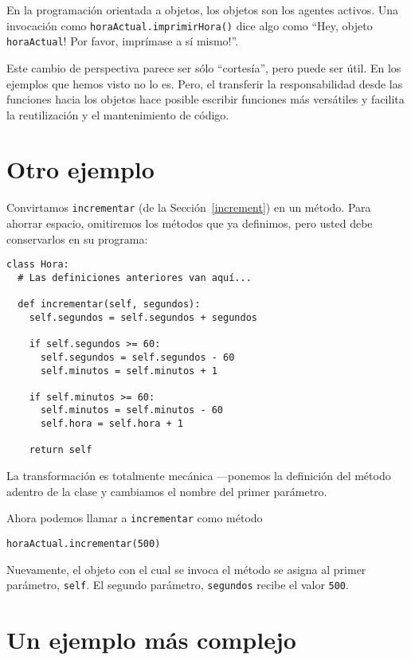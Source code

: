 En la programación orientada a objetos, los objetos son 
los agentes activos. Una invocación como \texttt{horaActual.imprimirHora()} 
dice algo como  ``Hey, objeto \texttt{horaActual}!  Por favor, imprímase a 
sí mismo!''.

Este cambio de perspectiva parece ser sólo ``cortesía'', pero puede
ser útil. En los ejemplos que hemos visto no lo es. Pero, el 
transferir la responsabilidad desde las funciones hacia los
objetos hace posible escribir funciones más versátiles y 
facilita la reutilización y el mantenimiento de código.


\section{Otro ejemplo}

Convirtamos  \texttt{incrementar} (de la Sección~\ref{increment}) en un método. Para ahorrar
espacio, omitiremos los métodos que ya definimos, pero 
usted debe conservarlos en su programa:


\beforeverb
\begin{verbatim}
class Hora:
  # Las definiciones anteriores van aquí...
  
  def incrementar(self, segundos):
    self.segundos = self.segundos + segundos

    if self.segundos >= 60:
      self.segundos = self.segundos - 60
      self.minutos = self.minutos + 1

    if self.minutos >= 60:
      self.minutos = self.minutos - 60
      self.hora = self.hora + 1

    return self

\end{verbatim}
\afterverb
%
La transformación es totalmente mecánica ---ponemos la definición 
del método adentro de la clase y cambiamos el nombre del primer
parámetro.

Ahora podemos llamar a  \texttt{incrementar} como método

\beforeverb
\begin{verbatim}
horaActual.incrementar(500)
\end{verbatim}
\afterverb
%
Nuevamente, el objeto con el cual se invoca el método se asigna
al primer parámetro, \texttt{self}. El segundo parámetro, 
\texttt{segundos} recibe el valor \texttt{500}.

\section{Un ejemplo más complejo}

